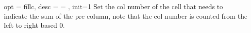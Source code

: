 \documentclass[full]{l3doc}
\begin{document}
\begin{documentation}
\begin{option}{ opt = fillc, desc = {= }, init=1 }
  Set the col number of the cell that needs to indicate the sum of the pre-column,
  note that the col number is counted from the left to right based 0.
\end{option}\\
\begin{SideBySideExample}[frame=single,numbers=left,xrightmargin=.64\linewidth,gobble=2]
  \centering
  \\
\end{SideBySideExample}

\end{documentation}
\end{document}
